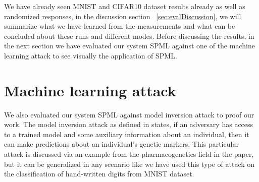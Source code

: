 We have already seen MNIST and CIFAR10 dataset results already as well as randomized responses, in the discussion section ~\ref{sec:evalDiscussion}, we will summarize what we have learned from the measurements and what can be concluded about these runs and different modes. Before discussing the results, in the next section we have evaluated our system SPML against one of the machine learning attack to see visually the application of SPML.

\section{Machine learning attack}
\label{sec:evalMLAttack}
We also evaluated our system SPML against model inversion attack \cite{17} to proof our work. The model inversion attack as defined in \cite{17} states, if an adversary has access to a trained model and some auxiliary information about an individual, then it can make predictions about an individual’s genetic markers. This particular attack is discussed via an example from the pharmacogenetics field in the paper, but it can be generalized in any scenario like we have used this type of attack on the classification of hand-written digits from MNIST \cite{12} dataset.
